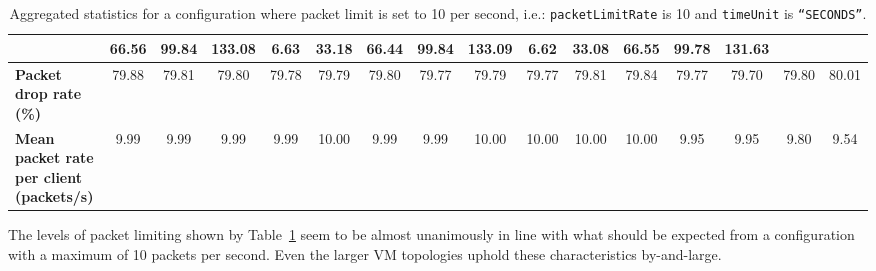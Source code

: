 \begin{table}[!h]
{\begin{tabular}{|l|ccccc|ccccc|ccccc|}
            & \multicolumn{1}{c|}{66.56}
            & \multicolumn{1}{c|}{99.84}
            & \multicolumn{1}{c|}{133.08}
            & \multicolumn{1}{c|}{6.63}
            & \multicolumn{1}{c|}{33.18}
            & \multicolumn{1}{c|}{66.44}
            & \multicolumn{1}{c|}{99.84}
            & \multicolumn{1}{c|}{133.09}
            & \multicolumn{1}{c|}{6.62}
            & \multicolumn{1}{c|}{33.08}
            & \multicolumn{1}{c|}{66.55}
            & \multicolumn{1}{c|}{99.78}
            & \multicolumn{1}{c|}{131.63}
            \\ \hline
            \textbf{Packet drop rate (\%)} & \multicolumn{1}{c|}{79.88} & \multicolumn{1}{c|}{79.81}
            & \multicolumn{1}{c|}{79.80}
            & \multicolumn{1}{c|}{79.78}
            & \multicolumn{1}{c|}{79.79}
            & \multicolumn{1}{c|}{79.80}
            & \multicolumn{1}{c|}{79.77}
            & \multicolumn{1}{c|}{79.79}
            & \multicolumn{1}{c|}{79.77}
            & \multicolumn{1}{c|}{79.81}
            & \multicolumn{1}{c|}{79.84}
            & \multicolumn{1}{c|}{79.77}
            & \multicolumn{1}{c|}{79.70}
            & \multicolumn{1}{c|}{79.80}
            & \multicolumn{1}{c|}{80.01}
            \\ \hline
            \textbf{Mean packet rate per client (packets/s)} & \multicolumn{1}{c|}{9.99} & \multicolumn{1}{c|}{9.99}
            & \multicolumn{1}{c|}{9.99}
            & \multicolumn{1}{c|}{9.99}
            & \multicolumn{1}{c|}{10.00}
            & \multicolumn{1}{c|}{9.99}
            & \multicolumn{1}{c|}{9.99}
            & \multicolumn{1}{c|}{10.00}
            & \multicolumn{1}{c|}{10.00}
            & \multicolumn{1}{c|}{10.00}
            & \multicolumn{1}{c|}{10.00}
            & \multicolumn{1}{c|}{9.95}
            & \multicolumn{1}{c|}{9.95}
            & \multicolumn{1}{c|}{9.80}
            & \multicolumn{1}{c|}{9.54}
            \\ \hline
        \end{tabular}
    }
    \caption{Aggregated statistics for a configuration where packet limit is set to 10 per second, i.e.:
    \texttt{packetLimitRate} is 10 and \texttt{timeUnit} is \texttt{``SECONDS''}.}
    \label{table:analysis_results_limit}
\end{table}

The levels of packet limiting shown by Table~\ref{table:analysis_results_limit} seem to be almost unanimously in
line with what should be expected from a configuration with a maximum of 10 packets per second. Even the larger VM
topologies uphold these characteristics by-and-large.

